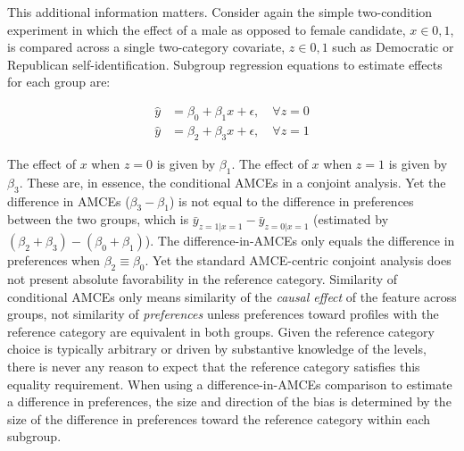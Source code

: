 \documentclass[a4paper,12pt]{article}\usepackage[]{graphicx}\usepackage[]{color}
\begin{document}
This additional information matters. Consider again the simple two-condition experiment in which the effect of a male as opposed to female candidate, $x \in {0,1}$, is compared across a single two-category covariate, $z \in {0,1}$ such as Democratic or Republican self-identification. Subgroup regression equations to estimate effects for each group are:

\begin{align*}
\hat{y} &= \beta_0 + \beta_1 x + \epsilon, \quad \forall z = 0 \\
\hat{y} &= \beta_2 + \beta_3 x + \epsilon, \quad \forall z = 1
\end{align*}

\noindent The effect of $x$ when $z=0$ is given by $\beta_1$. The effect of $x$ when $z=1$ is given by $\beta_3$. These are, in essence, the conditional AMCEs in a conjoint analysis. Yet the difference in AMCEs ($\beta_3 - \beta_1$) is not equal to the difference in preferences between the two groups, which is $\bar{y}_{z=1|x=1} - \bar{y}_{z=0|x=1}$ (estimated by $(\beta_2 + \beta_3) - (\beta_0 + \beta_1)$). The difference-in-AMCEs only equals the difference in preferences when $\beta_2 \equiv \beta_0$. Yet the standard AMCE-centric conjoint analysis does not present absolute favorability in the reference category. Similarity of conditional AMCEs only means similarity of the \textit{causal effect} of the feature across groups, not similarity of \textit{preferences} unless preferences toward profiles with the reference category are equivalent in both groups. Given the reference category choice is typically arbitrary or driven by substantive knowledge of the levels, there is never any reason to expect that the reference category satisfies this equality requirement. When using a difference-in-AMCEs comparison to estimate a difference in preferences, the size and direction of the bias is determined by the size of the difference in preferences toward the reference category within each subgroup.
\end{document}
